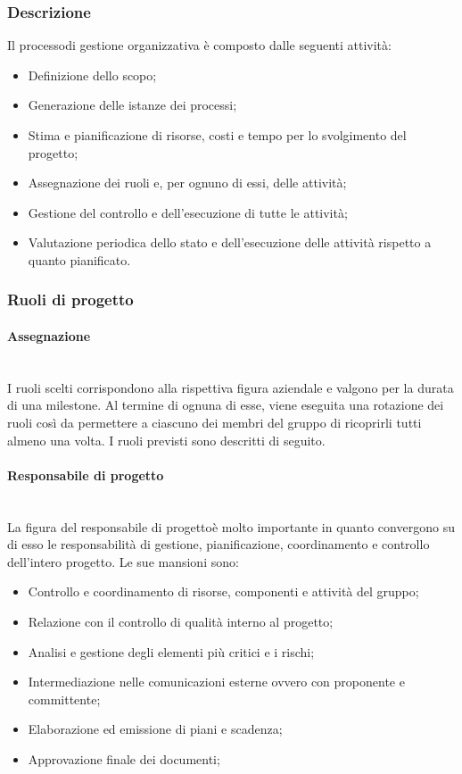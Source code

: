 		\subsubsection{Descrizione}
			Il processo\glosp di gestione organizzativa è composto dalle seguenti attività:
			\begin{itemize}
				\item Definizione dello scopo;
				\item Generazione delle istanze dei processi;
				\item Stima e pianificazione di risorse, costi e tempo per lo svolgimento del progetto\glo;
				\item Assegnazione dei ruoli e, per ognuno di essi, delle attività;
				\item Gestione del controllo e dell'esecuzione di tutte le attività;
				\item Valutazione periodica dello stato e dell'esecuzione delle attività rispetto a quanto pianificato.
			\end{itemize}
		\subsubsection{Ruoli di progetto}
			\paragraph{Assegnazione}\mbox{}\\ [1mm]
				I ruoli scelti corrispondono alla rispettiva figura aziendale e valgono per la durata di una milestone. Al termine di ognuna di esse, viene eseguita una rotazione dei ruoli così da permettere a ciascuno dei membri del gruppo di ricoprirli tutti almeno una volta.
				I ruoli previsti sono descritti di seguito.
			\paragraph{Responsabile di progetto}\mbox{}\\ [1mm]
				La figura del responsabile di progetto\glosp è molto importante in quanto convergono su di esso le responsabilità di gestione, pianificazione, coordinamento e controllo dell'intero progetto.
				Le sue mansioni sono:
				\begin{itemize}
					\item Controllo e coordinamento di risorse, componenti e attività del gruppo;
					\item Relazione con il controllo di qualità interno al progetto\glo;
					\item Analisi e gestione degli elementi più critici e i rischi;
					\item Intermediazione nelle comunicazioni esterne ovvero con proponente e committente;
					\item Elaborazione ed emissione di piani e scadenza;
					\item Approvazione finale dei documenti;
				\end{itemize}
